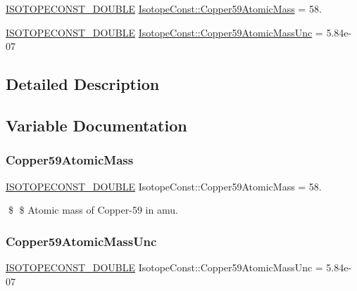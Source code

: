 \begin{DoxyCompactItemize}
\item 
\mbox{\hyperlink{group___isotope_const-_macros_ga8f45a7272ce02c0b4c65c44636ed719a}{I\+S\+O\+T\+O\+P\+E\+C\+O\+N\+S\+T\+\_\+\+D\+O\+U\+B\+LE}} \mbox{\hyperlink{group___isotope_const-_copper-_cu59_ga0cbd6b729fca8abe647486f99c92137a}{Isotope\+Const\+::\+Copper59\+Atomic\+Mass}} = 58.
\item 
\mbox{\hyperlink{group___isotope_const-_macros_ga8f45a7272ce02c0b4c65c44636ed719a}{I\+S\+O\+T\+O\+P\+E\+C\+O\+N\+S\+T\+\_\+\+D\+O\+U\+B\+LE}} \mbox{\hyperlink{group___isotope_const-_copper-_cu59_ga267679d8ef2897f15a7ebe411a904004}{Isotope\+Const\+::\+Copper59\+Atomic\+Mass\+Unc}} = 5.\+84e-\/07
\end{DoxyCompactItemize}


\subsection{Detailed Description}


\subsection{Variable Documentation}
\mbox{\label{group___isotope_const-_copper-_cu59_ga0cbd6b729fca8abe647486f99c92137a}} 
\subsubsection{\texorpdfstring{Copper59\+Atomic\+Mass}{Copper59AtomicMass}}
{\footnotesize\ttfamily \mbox{\hyperlink{group___isotope_const-_macros_ga8f45a7272ce02c0b4c65c44636ed719a}{I\+S\+O\+T\+O\+P\+E\+C\+O\+N\+S\+T\+\_\+\+D\+O\+U\+B\+LE}} Isotope\+Const\+::\+Copper59\+Atomic\+Mass = 58.}

\$ \$ Atomic mass of Copper-\/59 in amu. \mbox{\label{group___isotope_const-_copper-_cu59_ga267679d8ef2897f15a7ebe411a904004}} 
\subsubsection{\texorpdfstring{Copper59\+Atomic\+Mass\+Unc}{Copper59AtomicMassUnc}}
{\footnotesize\ttfamily \mbox{\hyperlink{group___isotope_const-_macros_ga8f45a7272ce02c0b4c65c44636ed719a}{I\+S\+O\+T\+O\+P\+E\+C\+O\+N\+S\+T\+\_\+\+D\+O\+U\+B\+LE}} Isotope\+Const\+::\+Copper59\+Atomic\+Mass\+Unc = 5.\+84e-\/07}

